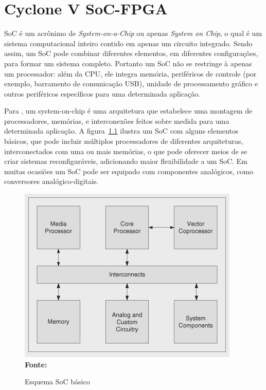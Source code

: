 \chapter{Cyclone V SoC-FPGA}\label{cap:soc}

SoC é um acrônimo de \textit{System-on-a-Chip} ou apenas \textit{System on Chip}, o qual é um sistema computacional inteiro contido em apenas um circuito integrado. Sendo assim, um SoC pode combinar diferentes elementos, em diferentes configurações, para formar um sistema completo.  Portanto um SoC não se restringe à apenas um processador: além da CPU,  ele integra memória, periféricos de controle (por exemplo, barramento de comunicação USB), unidade de processamento gráfico e outros periféricos específicos para uma determinada aplicação.  

Para , um system-on-chip é uma arquitetura que estabelece uma montagem de processadores, memórias, e interconexões feitos sobre medida para uma determinada aplicação. A figura~\ref{fig:socbasic} ilustra um SoC com alguns elementos básicos, que pode incluir múltiplos processadores  de diferentes arquiteturas, interconectados com uma ou mais memórias, o que pode oferecer meios de se criar sistemas reconfiguráveis, adicionando maior flexibilidade a um SoC.  Em muitas ocasiões um SoC pode ser equipado com componentes analógicos, como conversores analógico-digitais.


\begin{figure}[ht]
	\caption{Esquema SoC básico}
	\begin{center}
		\includegraphics[scale=0.68]{imagens/basicsoc.png}\\
		{\small \textbf{Fonte:} }
    \end{center}\label{fig:socbasic}
\end{figure}

